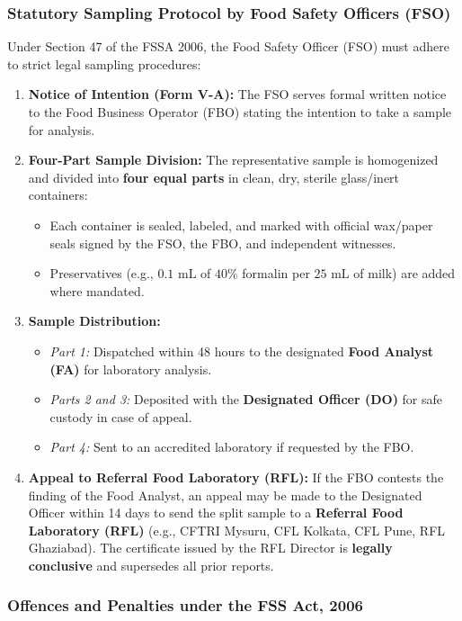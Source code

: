 \documentclass[11pt,a4paper,oneside]{article}
\begin{document}
\subsubsection{Statutory Sampling Protocol by Food Safety Officers (FSO)}
Under Section 47 of the FSSA 2006, the Food Safety Officer (FSO) must adhere to strict legal sampling procedures:
\begin{enumerate}[leftmargin=*]
    \item \textbf{Notice of Intention (Form V-A):} The FSO serves formal written notice to the Food Business Operator (FBO) stating the intention to take a sample for analysis.
    \item \textbf{Four-Part Sample Division:} The representative sample is homogenized and divided into \textbf{four equal parts} in clean, dry, sterile glass/inert containers:
    \begin{itemize}
        \item Each container is sealed, labeled, and marked with official wax/paper seals signed by the FSO, the FBO, and independent witnesses.
        \item Preservatives (e.g., $0.1\text{ mL}$ of $40\%$ formalin per $25\text{ mL}$ of milk) are added where mandated.
    \end{itemize}
    \item \textbf{Sample Distribution:}
    \begin{itemize}
        \item \textit{Part 1:} Dispatched within 48 hours to the designated \textbf{Food Analyst (FA)} for laboratory analysis.
        \item \textit{Parts 2 and 3:} Deposited with the \textbf{Designated Officer (DO)} for safe custody in case of appeal.
        \item \textit{Part 4:} Sent to an accredited laboratory if requested by the FBO.
    \end{itemize}
    \item \textbf{Appeal to Referral Food Laboratory (RFL):} If the FBO contests the finding of the Food Analyst, an appeal may be made to the Designated Officer within 14 days to send the split sample to a \textbf{Referral Food Laboratory (RFL)} (e.g., CFTRI Mysuru, CFL Kolkata, CFL Pune, RFL Ghaziabad). The certificate issued by the RFL Director is \textbf{legally conclusive} and supersedes all prior reports.
\end{enumerate}

\subsubsection{Offences and Penalties under the FSS Act, 2006}
\end{document}
